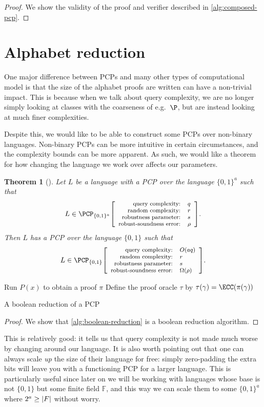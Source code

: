 \documentclass[english,12pt]{reedthesis}
\theoremstyle{plain}
\newtheorem{thm}{Theorem}[section]
\theoremstyle{definition}
\theoremstyle{remark}
\DeclarePairedDelimiter{\abs}{\lvert}{\rvert}
\newcommand{\pcpr}[4]{%
  \ensuremath%
  \mleft[{\footnotesize\begin{array}{r l}
    \text{query complexity:} & #1 \\
    \text{random complexity:} & #2 \\
    \text{robustness parameter:} & #3 \\
    \text{robust-soundness error:} & #4
  \end{array}}\mright]%
}
\begin{document}
\begin{proof}
  We show the validity of the proof and verifier described in
  \cref{alg:composed-pcp}.
\end{proof}


\section{Alphabet reduction}\label{sec:alph-reduction}

One major difference between PCPs and many other types of computational model is
that the size of the alphabet proofs are written can have a non-trivial impact.
This is because when we talk about query complexity, we are no longer simply
looking at classes with the coarseness of e.g.\ $\P$, but are instead looking at
much finer complexities.

Despite this, we would like to be able to construct some PCPs over non-binary
languages. Non-binary PCPs can be more intuitive in certain circumstances, and
the complexity bounds can be more apparent. As such, we would like a theorem for
how changing the language we work over affects our parameters.

\begin{thm}[{\cite[Lemma 2.13]{BGHSV06}}]%
  \label{thm:alph-reduction}
  Let $L$ be a language with a PCP over the language $\{0, 1\}^{a}$ such
  that
  \[
    L \in \PCP_{\{0, 1\}^{a}}\pcpr{q}{r}{s}{\rho}.
  \]
  Then $L$ has a PCP over the language $\{0, 1\}$ such that
  \[
    L \in \PCP_{\{0, 1\}}\pcpr{O(aq)}{r}{s}{\Omega(\rho)}.
  \]
\end{thm}

\begin{algorithm}[htbp]
  Run $P(x)$ to obtain a proof $\pi$\;
  Define the proof oracle $\tau$ by $\tau(\gamma) = \ECC(\pi(\gamma))$\;
  \KwRet{$(\pi, \tau)$}\;
  \caption{A boolean reduction of a PCP~\cite[Construction 3.6]{GOS25}}\label{alg:boolean-reduction}
\end{algorithm}

\begin{proof}
  We show that \cref{alg:boolean-reduction} is a boolean reduction algorithm.
\end{proof}

This is relatively good: it tells us that query complexity is not made much
worse by changing around our language. It is also worth pointing out that one
can always scale \emph{up} the size of their language for free: simply
zero-padding the extra bits will leave you with a functioning PCP for a larger
language. This is particularly useful since later on we will be working with
languages whose base is not $\{0, 1\}$ but some finite field $\mathbb{F}$, and
this way we can scale them to some $\{0, 1\}^{a}$ where $2^{a} \ge \abs{F}$
without worry.
\end{document}
